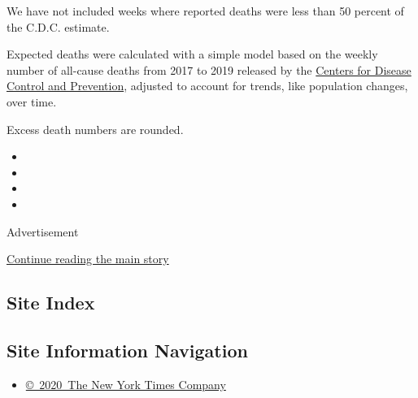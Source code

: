 We have not included weeks where reported deaths were less than 50
percent of the C.D.C. estimate.

Expected deaths were calculated with a simple model based on the weekly
number of all-cause deaths from 2017 to 2019 released by the
\href{https://www.cdc.gov/nchs/nvss/vsrr/covid19/index.htm}{Centers for
Disease Control and Prevention}, adjusted to account for trends, like
population changes, over time.

Excess death numbers are rounded.

\begin{itemize}
\item
\item
\item
\item
\end{itemize}

Advertisement

\protect\hyperlink{after-bottom}{Continue reading the main story}

\hypertarget{site-index}{%
\subsection{Site Index}\label{site-index}}

\hypertarget{site-information-navigation}{%
\subsection{Site Information
Navigation}\label{site-information-navigation}}

\begin{itemize}
\tightlist
\item
  \href{https://help.nytimes.com/hc/en-us/articles/115014792127-Copyright-notice}{©~2020~The
  New York Times Company}
\end{itemize}

